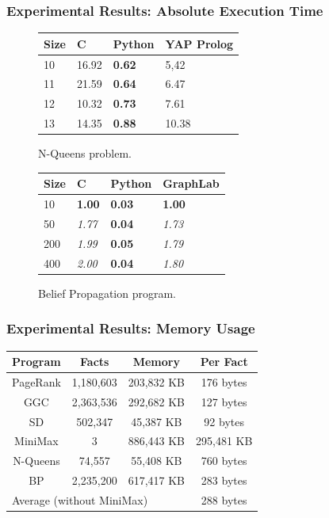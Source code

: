 \documentclass{beamer}
\begin{document}
\begin{frame}[fragile]
   \frametitle{Experimental Results: Absolute Execution Time}
   \begin{figure}[b]
      \begin{tabular}{ | l | l | l | l |}
       \hline
       Size & C & Python & YAP Prolog \\ \hline\hline
       10 & 16.92 & \textbf{0.62} & 5,42 \\
       11 & 21.59 & \textbf{0.64} & 6.47 \\
       12 & 10.32 & \textbf{0.73} & 7.61 \\
       13 & 14.35 & \textbf{0.88} & 10.38 \\
       \hline
       \end{tabular}
       \caption{N-Queens problem.}
    \end{figure}
    \begin{figure}[b]
       \begin{tabular}{ | l | l | l | l |}
        \hline

        Size & C & Python & GraphLab \\ \hline\hline
        10 & \textbf{1.00} & \textbf{0.03} & \textbf{1.00} \\
        50 & \textit{1.77} & \textbf{0.04} & \textit{1.73} \\
        200 & \textit{1.99} & \textbf{0.05} & \textit{1.79} \\
        400 & \textit{2.00} & \textbf{0.04} & \textit{1.80} \\
        \hline
        \end{tabular}
        \caption{Belief Propagation program.}
    \end{figure}
\end{frame}

\begin{frame}[fragile]
   \frametitle{Experimental Results: Memory Usage}
   \begin{center}
\begin{tabular}{c|c|c|c}
\textbf{Program} & \textbf{Facts} & \textbf{Memory} & \textbf{Per Fact} \\
\hline\hline
PageRank & 1,180,603 & 203,832 KB & 176 bytes \\
GGC & 2,363,536 & 292,682 KB & 127 bytes \\
SD & 502,347 & 45,387 KB & 92 bytes \\
MiniMax & 3 & 886,443 KB & 295,481 KB \\
N-Queens & 74,557 & 55,408 KB & 760 bytes \\
BP & 2,235,200 & 617,417 KB & 283 bytes \\
\hline\hline
\multicolumn{3}{l}{Average (without MiniMax) } & 288 bytes \\
\end{tabular}
\end{center}
\end{frame}
\end{document}
